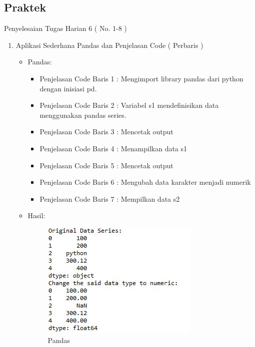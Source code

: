 \subsection{Praktek}
Penyelesaian Tugas Harian 6 ( No. 1-8 )
\begin{enumerate}
\item Aplikasi Sederhana Pandas dan Penjelasan Code ( Perbaris )
\begin{itemize}
\item Pandas:
\par 
\par
\begin{itemize}
\item Penjelasan Code Baris 1 : Mengimport library pandas dari python dengan inisiasi pd.
\par
\item Penjelasan Code Baris 2 : Variabel s1 mendefinisikan data menggunakan pandas series.
\par
\item Penjelasan Code Baris 3 : Mencetak output
\par
\item Penjelasan Code Baris 4 : Menampilkan data s1
\par
\item Penjelasan Code Baris 5 : Mencetak output
\par
\item Penjelasan Code Baris 6 : Mengubah data karakter menjadi numerik
\par
\item Penjelasan Code Baris 7 : Mempilkan data s2
\par
\end{itemize}
\item Hasil:
\par
\par
\begin{figure}[ht]
\centering
\includegraphics[scale=0.8]{figures/pandas.jpg}
\caption{Pandas}
\label{contoh}
\end{figure}
\par


\end{itemize}
\end{enumerate}
